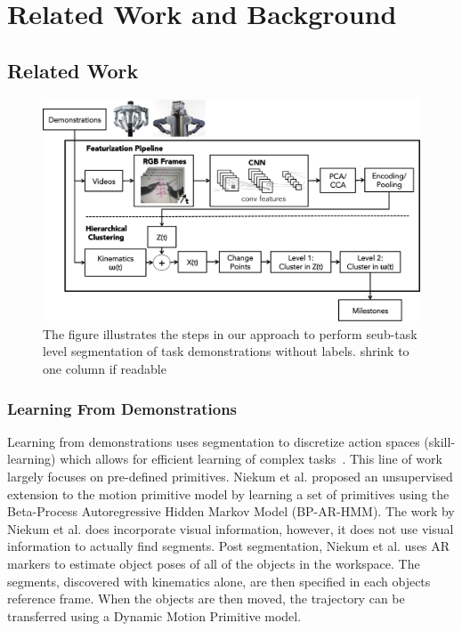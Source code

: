 \section{Related Work and Background}

\subsection{Related Work}
\begin{figure}[!t]
\centering
\includegraphics[width=0.7\linewidth]{figures/system_architecture_2.png}
\caption{ 
The figure illustrates the steps in our approach to perform seub-task level segmentation of task demonstrations without labels.
{\color{blue}shrink to one column if readable}
}
\label{fig:pipeline}
\vspace{-10pt}
\end{figure}

\subsubsection{Learning From Demonstrations}
Learning from demonstrations uses segmentation to discretize action spaces (skill-learning) 
which allows for efficient learning of complex tasks~\cite{ijspreet2002learning,pastor2009learning}.
This line of work largely focuses on pre-defined primitives.
Niekum et al. \cite{niekum2012learning} proposed an unsupervised extension to the motion primitive model by learning a set of primitives using the Beta-Process Autoregressive Hidden Markov Model (BP-AR-HMM).
The work by Niekum et al. does incorporate visual information, however, it does not use visual information to actually find segments.
 Post segmentation,  Niekum et al. uses AR markers to estimate object poses of all of the objects in the workspace.
The segments, discovered with kinematics alone, are then specified in each objects reference frame.
When the objects are then moved, the trajectory can be transferred using a Dynamic Motion Primitive model.

